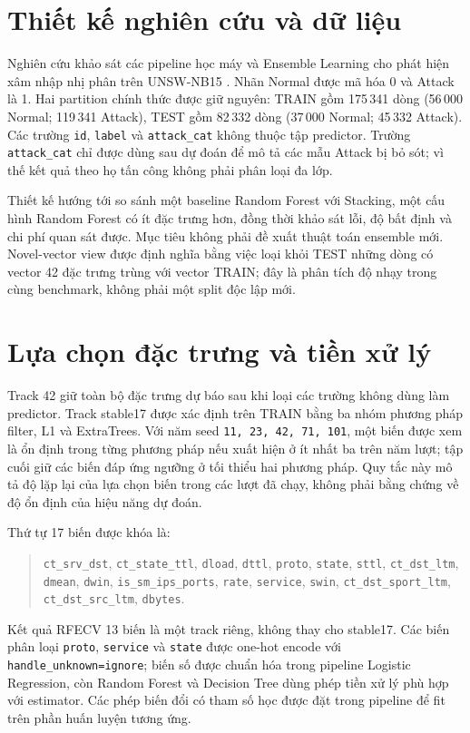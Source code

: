 \section{Thiết kế nghiên cứu và dữ liệu}
\label{sec:method-design}

Nghiên cứu khảo sát các pipeline học máy và Ensemble Learning cho phát hiện xâm nhập nhị phân trên UNSW-NB15 \cite{moustafa2015unsw}. Nhãn Normal được mã hóa 0 và Attack là 1. Hai partition chính thức được giữ nguyên: TRAIN gồm 175\,341 dòng (56\,000 Normal; 119\,341 Attack), TEST gồm 82\,332 dòng (37\,000 Normal; 45\,332 Attack). Các trường \texttt{id}, \texttt{label} và \texttt{attack\_cat} không thuộc tập predictor. Trường \texttt{attack\_cat} chỉ được dùng sau dự đoán để mô tả các mẫu Attack bị bỏ sót; vì thế kết quả theo họ tấn công không phải phân loại đa lớp.

Thiết kế hướng tới so sánh một baseline Random Forest với Stacking, một cấu hình Random Forest có ít đặc trưng hơn, đồng thời khảo sát lỗi, độ bất định và chi phí quan sát được. Mục tiêu không phải đề xuất thuật toán ensemble mới. Novel-vector view được định nghĩa bằng việc loại khỏi TEST những dòng có vector 42 đặc trưng trùng với vector TRAIN; đây là phân tích độ nhạy trong cùng benchmark, không phải một split độc lập mới.

\section{Lựa chọn đặc trưng và tiền xử lý}
\label{sec:method-feature-selection}

Track 42 giữ toàn bộ đặc trưng dự báo sau khi loại các trường không dùng làm predictor. Track stable17 được xác định trên TRAIN bằng ba nhóm phương pháp filter, L1 và ExtraTrees. Với năm seed \texttt{11, 23, 42, 71, 101}, một biến được xem là ổn định trong từng phương pháp nếu xuất hiện ở ít nhất ba trên năm lượt; tập cuối giữ các biến đáp ứng ngưỡng ở tối thiểu hai phương pháp. Quy tắc này mô tả độ lặp lại của lựa chọn biến trong các lượt đã chạy, không phải bằng chứng về độ ổn định của hiệu năng dự đoán.

Thứ tự 17 biến được khóa là:
\begin{quote}\small\raggedright
\texttt{ct\_srv\_dst}, \texttt{ct\_state\_ttl}, \texttt{dload}, \texttt{dttl},
\texttt{proto}, \texttt{state}, \texttt{sttl}, \texttt{ct\_dst\_ltm},
\texttt{dmean}, \texttt{dwin}, \texttt{is\_sm\_ips\_ports},
\texttt{rate}, \texttt{service}, \texttt{swin},
\texttt{ct\_dst\_sport\_ltm}, \texttt{ct\_dst\_src\_ltm}, \texttt{dbytes}.
\end{quote}
Kết quả RFECV 13 biến là một track riêng, không thay cho stable17. Các biến phân loại \texttt{proto}, \texttt{service} và \texttt{state} được one-hot encode với \texttt{handle\_unknown=ignore}; biến số được chuẩn hóa trong pipeline Logistic Regression, còn Random Forest và Decision Tree dùng phép tiền xử lý phù hợp với estimator. Các phép biến đổi có tham số học được đặt trong pipeline để fit trên phần huấn luyện tương ứng.

